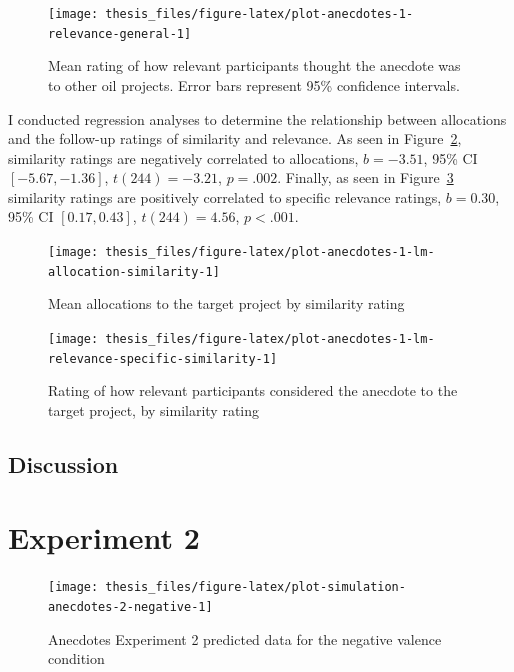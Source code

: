\documentclass[a4paper, nobind, dvipsnames]{templates/ociamthesis}
\theoremstyle{definition}
\theoremstyle{definition}
\theoremstyle{definition}
\theoremstyle{definition}
\theoremstyle{remark}
\begin{document}
\begin{figure}
\texttt{[image: thesis\_files/figure-latex/plot-anecdotes-1-relevance-general-1]} \caption{Mean rating of how relevant participants thought the anecdote was to other oil projects. Error bars represent 95\% confidence intervals.}\label{fig:plot-anecdotes-1-relevance-general}
\end{figure}

I conducted regression analyses to determine the relationship between
allocations and the follow-up ratings of similarity and relevance. As seen in
Figure~\ref{fig:plot-anecdotes-1-lm-allocation-similarity}, similarity ratings
are negatively correlated to allocations,
\(b = -3.51\), 95\% CI \([-5.67, -1.36]\), \(t(244) = -3.21\), \(p = .002\). Finally, as seen in
Figure~\ref{fig:plot-anecdotes-1-lm-relevance-specific-similarity} similarity
ratings are positively correlated to specific relevance ratings,
\(b = 0.30\), 95\% CI \([0.17, 0.43]\), \(t(244) = 4.56\), \(p < .001\).



\begin{figure}
\texttt{[image: thesis\_files/figure-latex/plot-anecdotes-1-lm-allocation-similarity-1]} \caption{Mean allocations to the target project by similarity rating}\label{fig:plot-anecdotes-1-lm-allocation-similarity}
\end{figure}



\begin{figure}
\texttt{[image: thesis\_files/figure-latex/plot-anecdotes-1-lm-relevance-specific-similarity-1]} \caption{Rating of how relevant participants considered the anecdote to the target project, by similarity rating}\label{fig:plot-anecdotes-1-lm-relevance-specific-similarity}
\end{figure}

\hypertarget{discussion-16}{%
\subsection{Discussion}\label{discussion-16}}

\hypertarget{anecdotes-2-appendix}{%
\section{Experiment 2}\label{anecdotes-2-appendix}}



\begin{figure}
\texttt{[image: thesis\_files/figure-latex/plot-simulation-anecdotes-2-negative-1]} \caption{Anecdotes Experiment 2 predicted data for the negative valence condition}\label{fig:plot-simulation-anecdotes-2-negative}
\end{figure}
\end{document}
